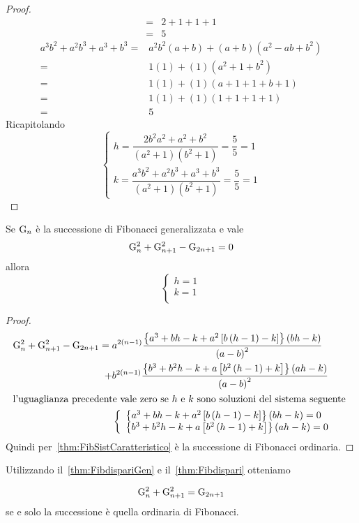 \begin{proof}
\begin{align*}
	={}&2+1+1+1\\
	={}&5
\end{align*}
\begin{align*}
	a^3b^2+a^2b^3+a^3+b^3={}&a^2b^2(a+b)+(a+b)(a^2-ab+b^2)\\
	={}&1(1)+(1)(a^2+1+b^2)\\
	={}&1(1)+(1)(a+1+1+b+1)\\
	={}&1(1)+(1)(1+1+1+1)\\
	={}&5
\end{align*}
Ricapitolando
\[\left\{
\begin{array}{l}
	h=\dfrac{2b^2a^2+a^2+b^2}{(a^2+1)(b^2+1)}=\dfrac{5}{5}=1\\
	k=\dfrac{a^3b^2+a^2b^3+a^3+b^3}{(a^2+1)(b^2+1)}=\dfrac{5}{5}=1
\end{array}
\right.\]
\end{proof}
\begin{thm}[Dispari]\label{thm:FibdispariGen}
	Se $\mathrm{G}_{n}$ è la successione di Fibonacci generalizzata e vale 
	\begin{equation}
		\mathrm{G}_{n}^2+\mathrm{G}_{n+1}^2-\mathrm{G}_{2n+1}=0 
	\end{equation}\label{eqn:FibDispariGen} allora 
\[\begin{cases}
	h=1\\
	k=1\\
\end{cases}\]
\end{thm}
\begin{proof}
\begin{align*}
\mathrm{G}_{n}^2+\mathrm{G}_{n+1}^2-\mathrm{G}_{2n+1}={}&a^{2(n-1)}\dfrac{\left\{a^3+bh-k+a^2\left[b\left(h-1\right)-k\right]\right\}\left(bh-k\right)}{\left(a-b\right)^2}\\
+&b^{2(n-1)}\dfrac{\left\{b^3+b^2h-k+a\left[b^2\left(h-1\right)+k\right]\right\}\left(ah-k\right)}{\left(a-b\right)^2}\\
\intertext{l'uguaglianza precedente vale zero se $h$ e $k$ sono soluzioni del sistema seguente }
&\left\{
\begin{array}{l}
\left\{a^3+bh-k+a^2\left[b\left(h-1\right)-k\right]\right\}\left(bh-k\right)=0\\
\left\{b^3+b^2h-k+a\left[b^2\left(h-1\right)+k\right]\right\}\left(ah-k\right)=0
\end{array}
\right.
\end{align*}
Quindi per~\vref{thm:FibSistCaratteristico} è la successione di Fibonacci ordinaria.
\end{proof}
Utilizzando il~\vref{thm:FibdispariGen} e il~\vref{thm:Fibdispari} otteniamo
\begin{thm}[Unicità]
	\begin{equation}
		\mathrm{G}_{n}^2+\mathrm{G}_{n+1}^2=\mathrm{G}_{2n+1} 
	\end{equation} se e solo la successione è quella ordinaria di Fibonacci. 
\end{thm}